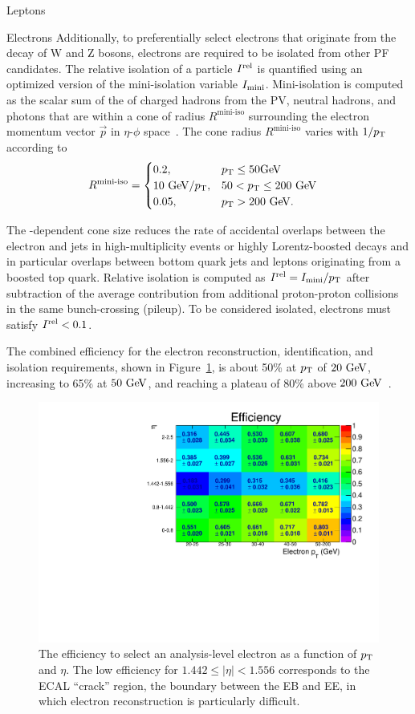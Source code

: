 \begin{section}{Leptons}
\begin{subsection}{Electrons}
Additionally, to preferentially select electrons that originate from the decay of W and Z bosons, electrons are required to be isolated from other PF candidates.
The relative isolation of a particle $I^{\mathrm{rel}}$ is quantified using an optimized version of the mini-isolation variable $I_{\mathrm{mini}}$.
Mini-isolation is computed as the scalar sum of the \pT of charged hadrons from the PV, neutral hadrons, and photons that are within a cone of radius $R^{\text{mini-iso}}$ surrounding the electron momentum vector $\vec{p}$ in $\eta$-$\phi$ space~\cite{Rehermann:2010vq}.
The cone radius $R^{\text{mini-iso}}$ varies with $1/p_{\mathrm{T}}$ according to
\begin{align}
R^{\text{mini-iso}} &=\begin{cases} 0.2, &
p_{\mathrm{T}} \leq 50\mathrm{Ge\kern -0.1em V} \\
{10~\mathrm{Ge\kern -0.1em V}}/{p_{\mathrm{T}}}, & 50 < p_{\mathrm{T}} \leq 200~\mathrm{Ge\kern -0.1em V} \\
0.05, & p_{\mathrm{T}} > 200~\mathrm{Ge\kern -0.1em V}.
\end{cases}
\end{align}

The \pT-dependent cone size reduces the rate of accidental overlaps between the electron and jets in high-multiplicity events or highly Lorentz-boosted decays and in particular overlaps between bottom quark jets and leptons originating from a boosted top quark.
Relative isolation is computed as $I^{\mathrm{rel}} = I_{\mathrm{mini}}/p_{\mathrm{T}}$ after subtraction of the average contribution from additional proton-proton collisions in the same bunch-crossing (pileup).
To be considered isolated, electrons must satisfy $I^{\mathrm{rel}} < 0.1$.

The combined efficiency for the electron reconstruction, identification, and isolation requirements, shown in Figure~\ref{fig:electron_eff}, is about 50\% at $p_{\mathrm{T}}$ of $20~\mathrm{Ge\kern -0.1em V}$, increasing to 65\% at $50~\mathrm{Ge\kern -0.1em V}$, and reaching a plateau of 80\% above $200~\mathrm{Ge\kern -0.1em V}$~\cite{Khachatryan:2015hwa}.

\begin{figure}[tbp!]
\centering
\includegraphics[angle=0,width=0.80\columnwidth]{fig/electron_eff.pdf}
\caption{The efficiency to select an analysis-level electron as a function of $p_{\mathrm{T}}$ and $\eta$.
The low efficiency for $1.442 \leq |\eta| < 1.556$ corresponds to the ECAL ``crack'' region, the boundary between the EB and EE, in which electron reconstruction is particularly difficult.}
\label{fig:electron_eff}
\end{figure}


\end{subsection}
\end{section}
